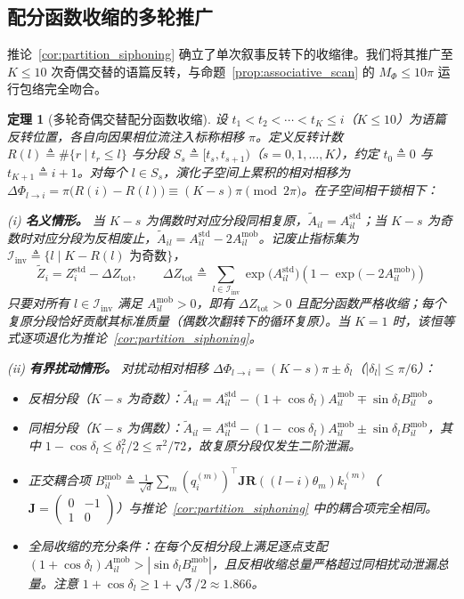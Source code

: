 \documentclass[11pt,a4paper]{article}
\newtheorem{theorem}{定理}
\theoremstyle{definition}
\begin{document}
\subsection{配分函数收缩的多轮推广}
推论~\ref{cor:partition_siphoning} 确立了单次叙事反转下的收缩律。我们将其推广至 $K \le 10$ 次奇偶交替的语篇反转，与命题~\ref{prop:associative_scan} 的 $M_\Phi \le 10\pi$ 运行包络完全吻合。

\begin{theorem}[多轮奇偶交替配分函数收缩]
\label{thm:multi_turn_contraction}
设 $t_1 < t_2 < \cdots < t_K \le i$（$K \le 10$）为语篇反转位置，各自向因果相位流注入标称相移 $\pi$。定义反转计数 $R(l) \triangleq \#\{r \mid t_r \le l\}$ 与分段 $S_s \triangleq [t_s, t_{s+1})$（$s = 0, 1, \dots, K$），约定 $t_0 \triangleq 0$ 与 $t_{K+1} \triangleq i+1$。对每个 $l \in S_s$，演化子空间上累积的相对相移为 $\Delta\Phi_{l \to i} = \pi\big(R(i) - R(l)\big) \equiv (K - s)\pi \pmod{2\pi}$。在子空间相干锁相下：

(i) \textbf{名义情形。} 当 $K - s$ 为偶数时对应分段同相复原，$\tilde{A}_{il} = A_{il}^{\text{std}}$；当 $K - s$ 为奇数时对应分段为反相废止，$\tilde{A}_{il} = A_{il}^{\text{std}} - 2A_{il}^{\text{mob}}$。记废止指标集为 $\mathcal{I}_{\text{inv}} \triangleq \{l \mid K - R(l) \text{ 为奇数}\}$，
\begin{equation}
\tilde{Z}_i = Z_i^{\mathrm{std}} - \Delta Z_{\text{tot}}, \qquad \Delta Z_{\text{tot}} \triangleq \sum_{l \in \mathcal{I}_{\text{inv}}} \exp\big(A_{il}^{\text{std}}\big)\left(1 - \exp\big(-2A_{il}^{\text{mob}}\big)\right)
\end{equation}
只要对所有 $l \in \mathcal{I}_{\text{inv}}$ 满足 $A_{il}^{\text{mob}} > 0$，即有 $\Delta Z_{\text{tot}} > 0$ 且配分函数严格收缩；每个复原分段恰好贡献其标准质量（偶数次翻转下的循环复原）。当 $K = 1$ 时，该恒等式逐项退化为推论~\ref{cor:partition_siphoning}。

(ii) \textbf{有界扰动情形。} 对扰动相对相移 $\Delta\Phi_{l \to i} = (K - s)\pi \pm \delta_l$（$|\delta_l| \le \pi/6$）：
\begin{itemize}
    \item 反相分段（$K - s$ 为奇数）：$\tilde{A}_{il} = A_{il}^{\text{std}} - (1 + \cos\delta_l)A_{il}^{\text{mob}} \mp \sin\delta_l B_{il}^{\text{mob}}$。
    \item 同相分段（$K - s$ 为偶数）：$\tilde{A}_{il} = A_{il}^{\text{std}} - (1 - \cos\delta_l)A_{il}^{\text{mob}} \pm \sin\delta_l B_{il}^{\text{mob}}$，其中 $1 - \cos\delta_l \le \delta_l^2/2 \le \pi^2/72$，故复原分段仅发生二阶泄漏。
    \item 正交耦合项 $B_{il}^{\text{mob}} \triangleq \frac{1}{\sqrt{d}}\sum_m (q_i^{(m)})^\top \mathbf{J} \mathbf{R}((l-i)\theta_m) k_l^{(m)}$（$\mathbf{J} = \begin{pmatrix} 0 & -1 \\ 1 & 0 \end{pmatrix}$）与推论~\ref{cor:partition_siphoning} 中的耦合项完全相同。
    \item 全局收缩的充分条件：在每个反相分段上满足逐点支配 $(1 + \cos\delta_l)A_{il}^{\text{mob}} > |\sin\delta_l B_{il}^{\text{mob}}|$，且反相收缩总量严格超过同相扰动泄漏总量。注意 $1 + \cos\delta_l \ge 1 + \sqrt{3}/2 \approx 1.866$。
\end{itemize}
\end{theorem}
\end{document}

